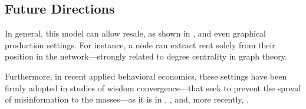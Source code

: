 \documentclass[cm,linguex]{glossa}
\theoremstyle{defn}
\theoremstyle{axiom}
\theoremstyle{thm}
\theoremstyle{lem}
\theoremstyle{cor}
\theoremstyle{prop}
\theoremstyle{rmk}
\begin{document}
\hypertarget{future-directions}{%
\subsection{Future Directions}\label{future-directions}}

In general, this model can allow resale, as shown in \citet{resale}, and
even graphical production settings. For instance, a node can extract
rent solely from their position in the network---strongly related to
degree centrality in graph theory.

Furthermore, in recent applied behavioral economics, these settings have
been firmly adopted in studies of wisdom convergence---that seek to
prevent the spread of misinformation to the masses---as it is in
\citet{degroot}, \citet{learn}, and, more recently, \citet{naive}.

\newpage


\end{document}
